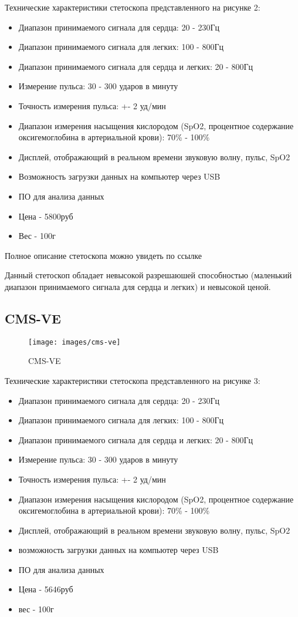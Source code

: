 \documentclass[../main.tex]{subfiles}
\begin{document}
Технические характеристики  стетоскопа представленного на рисунке 2:
\begin{itemize}
  \item Диапазон принимаемого сигнала для сердца: 20 - 230Гц
  \item Диапазон принимаемого сигнала для легких: 100 - 800Гц
  \item Диапазон принимаемого сигнала для сердца и легких: 20 - 800Гц
  \item Измерение пульса: 30 - 300 ударов в минуту
  \item Точность измерения пульса: +- 2 уд/мин
  \item Диапазон измерения насыщения кислородом (SpO2, процентное содержание оксигемоглобина в артериальной крови): 70\% - 100\%
  \item Дисплей, отображающий в реальном времени звуковую волну, пульс, SpO2
  \item Возможность загрузки данных на компьютер через USB
  \item ПО для анализа данных
  \item Цена - 5800руб
  \item Вес - 100г
\end{itemize}

Полное описание стетоскопа можно увидеть по ссылке \cite{cms-vesd}

Данный стетоскоп обладает невысокой разрешаюшей способностью (маленький диапазон принимаемого сигнала для сердца и легких) и невысокой ценой.

\subsection{CMS-VE}
\begin{figure}[H]
\centering
\texttt{[image: images/cms-ve]}
\caption{CMS-VE}
\end{figure}

Технические характеристики стетоскопа представленного на рисунке 3:
\begin{itemize}
  \item Диапазон принимаемого сигнала для сердца: 20 - 230Гц
  \item Диапазон принимаемого сигнала для легких: 100 - 800Гц
  \item Диапазон принимаемого сигнала для сердца и легких: 20 - 800Гц
  \item Измерение пульса: 30 - 300 ударов в минуту
  \item Точность измерения пульса: +- 2 уд/мин
  \item Диапазон измерения насыщения кислородом (SpO2, процентное содержание оксигемоглобина в артериальной крови): 70\% - 100\%
  \item Дисплей, отображающий в реальном времени звуковую волну, пульс, SpO2
  \item возможность загрузки данных на компьютер через USB
  \item ПО для анализа данных
  \item Цена - 5646руб
  \item вес - 100г
\end{itemize}
\end{document}
